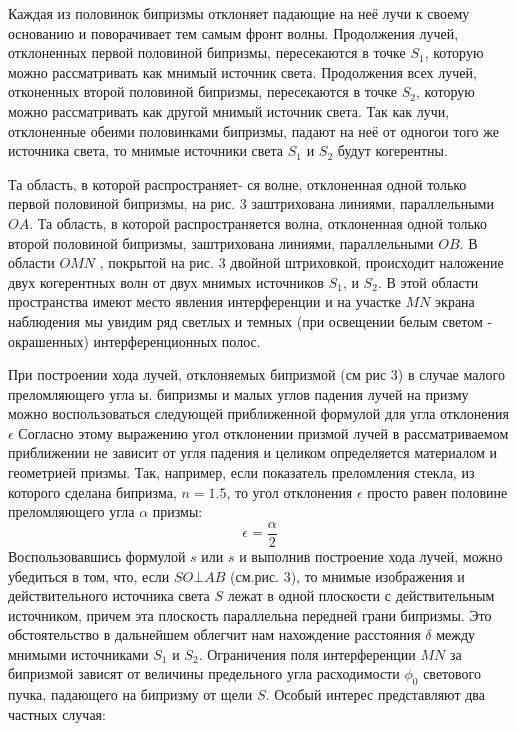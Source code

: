 Каждая из половинок бипризмы отклоняет падающие на неё лучи к своему основанию и поворачивает тем самым фронт волны.  Продолжения лучей, отклоненных первой половиной бипризмы, пересекаются в точке $S_1$, которую можно рассматривать как мнимый источник света. Продолжения всех лучей, отконенных второй половиной бипризмы, пересекаются в точке $S_2$, которую можно рассматривать как другой мнимый источник света. Так как лучи, отклоненные обеими половинками бипризмы, падают на неё от одногои того же источника света, то мнимые источники света $S_1$ и $S_2$ будут когерентны. 

Та область, в которой распространяет- ся волне, отклоненная одной только первой половиной бипризмы, на рис. 3 заштрихована линиями, параллельными $OA$. Та область, в которой распространяется волна, отклоненная одной только второй половиной бипризмы, заштрихована линиями, параллельными $OB$. В области $OMN$ , покрытой на рис. 3 двойной
штриховкой, происходит наложение двух когерентных волн от двух мнимых источников $S_1$, и $S_2$. В этой области пространства имеют место явления интерференции и на участке $MN$ экрана
наблюдения мы увидим ряд светлых и темных (при освещении белым светом - окрашенных) интерференционных полос.

При построении хода лучей, отклоняемых бипризмой (см рис 3) в случае малого преломляющего угла ы. бипризмы и малых углов падения лучей на призму можно воспользоваться следующей приближенной формулой для угла отклонения $\epsilon$
Согласно этому выражению угол отклонении призмой лучей в рассматриваемом приближении не зависит от угля падения и целиком определяется материалом и геометрией призмы. Так, например, если показатель преломления стекла, из которого сделана бипризма, $n=1.5$, то угол отклонения $\epsilon$ просто равен половине преломляющего угла $\alpha$ призмы:
\begin{equation}
 	\epsilon=\frac{\alpha}{2}
 \end{equation} 
Воспользовавшись формулой $s$ или $s$ и выполнив построение хода лучей, можно убедиться в том, что, если $SO\bot AB$ (см.рис. 3), то мнимые изображения	и	действительного источника света $S$ лежат в одной плоскости с действительным источником, причем эта плоскость параллельна передней грани бипризмы. Это обстоятельство в дальнейшем облегчит нам нахождение расстояния $\delta$ между мнимыми источниками $S_1$ и	$S_2$.
Ограничения поля интерференции $MN$ за бипризмой зависят от величины предельного угла расходимости $\phi_0$ светового пучка, падающего на бипризму от щели $S$. Особый интерес представляют два частных случая:

